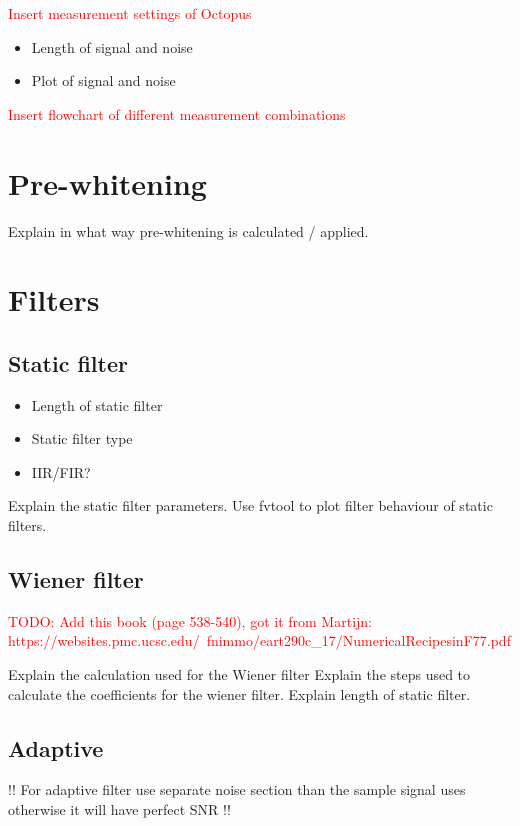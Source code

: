 \textcolor{red}{Insert measurement settings of Octopus}

\begin{itemize}
    \item Length of signal and noise
    \item Plot of signal and noise
\end{itemize}

\textcolor{red}{Insert flowchart of different measurement combinations}

\section{Pre-whitening}
Explain in what way pre-whitening is calculated / applied.
\section{Filters}
\subsection{Static filter}

\begin{itemize}
    \item Length of static filter
    \item Static filter type
    \item IIR/FIR? 
\end{itemize}

Explain the static filter parameters. Use fvtool to plot filter behaviour of static filters.

\subsection{Wiener filter}

\textcolor{red}{TODO: Add this book (page 538-540), got it from Martijn: https://websites.pmc.ucsc.edu/~fnimmo/eart290c_17/NumericalRecipesinF77.pdf}



Explain the calculation used for the Wiener filter
Explain the steps used to calculate the coefficients for the wiener filter. Explain length of static filter. 
\subsection{Adaptive}

!! For adaptive filter use separate noise section than the sample signal uses otherwise it will have perfect SNR !!

